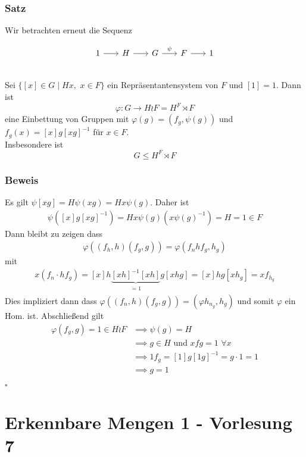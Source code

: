 \documentclass[12pt, german]{article}
\newcommand{\bewiesen}{

\begin{flushright}
		$\square$  \\
\end{flushright}}
\begin{document}
\subsubsection{Satz}
	Wir betrachten erneut die Sequenz 
	\begin{figure}[h!]
		\centering
		\begin{equation*}
		\begin{tikzcd}[column sep=1.5pc]
		1 \arrow{r}{} & H \arrow{r}{} & G \arrow{r}{\psi} & F \arrow{r}{} & 1
		\end{tikzcd}
		\end{equation*}
	\end{figure} \\ 
	Sei $\{[x] \in G \mid Hx, \, \, x \in F\}$ ein Repräsentantensystem von $F$ und $[1] = 1$. 
	Dann ist $$\varphi: G \to H \wr F = H^F \rtimes F$$ eine Einbettung von Gruppen mit $\varphi(g) = (f_g, \psi(g))$ und $f_g(x) = [x]g[xg]^{-1}$ für $x \in F$. \\  Insbesondere ist $$G \leq H^F \rtimes F$$

\subsubsection{Beweis}
	Es gilt $\psi[xg] = H\psi(xg) = Hx\psi(g)$. Daher ist
	\begin{align*}
		\psi([x]g[xg]^{-1}) = Hx\psi(g)(x\psi(g)^{-1}) = H = 1 \in F
	\end{align*}
	Dann bleibt zu zeigen dass 
	\begin{align*}
		\varphi((f_h, h)(f_g, g)) = \varphi(f_nhf_g, h_g) 
	\end{align*}
	mit 
	\begin{align*}
	x(f_n \cdot hf_g) = [x]h\underbrace{[xh]^{-1}[xh]}_{\substack{=1}}g[xhg] = [x]hg[xh_g] = xf_{h_g}
	\end{align*}
	Dies impliziert dann dass $\varphi((f_n, h)(f_g,g)) = (\varphi h_{n_g}, h_g)$ und somit $\varphi$ ein Hom. ist. 
	Abschließend gilt 
	\begin{align*}
	\varphi(f_g, g) = 1 \in H \wr F &\implies \psi(g) = H \\
	&\implies g \in H \text{ und } xfg = 1 \, \, \forall x \\ 
	&\implies 1f_g = [1]g[1g]^{-1} = g \cdot 1 = 1 \\
	&\implies g = 1
	\end{align*}
	\bewiesen

\section{Erkennbare Mengen 1 - Vorlesung 7}
\end{document}
